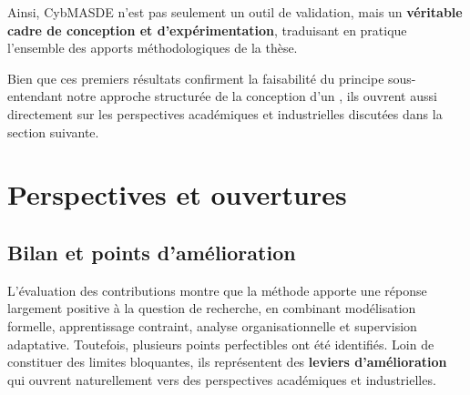 Ainsi, CybMASDE n’est pas seulement un outil de validation, mais un \textbf{véritable cadre de conception et d’expérimentation}, traduisant en pratique l’ensemble des apports méthodologiques de la thèse.


\noindent
Bien que ces premiers résultats confirment la faisabilité du principe sous-entendant notre approche structurée de la conception d'un , ils ouvrent aussi directement sur les perspectives académiques et industrielles discutées dans la section suivante.

\section*{Perspectives et ouvertures}
\label{sec:perspectives}

\subsection*{Bilan et points d’amélioration}

L’évaluation des contributions montre que la méthode  apporte une réponse largement positive à la question de recherche, en combinant modélisation formelle, apprentissage contraint, analyse organisationnelle et supervision adaptative.
Toutefois, plusieurs points perfectibles ont été identifiés. Loin de constituer des limites bloquantes, ils représentent des \textbf{leviers d’amélioration} qui ouvrent naturellement vers des perspectives académiques et industrielles.

